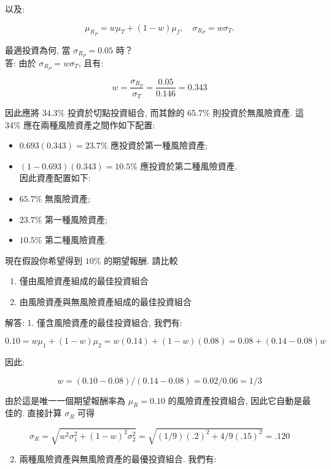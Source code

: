 \documentclass[letterpaper]{article}
\begin{document}
		以及: 
		
		$$
		\mu_{R_{P}}=w \mu_{T}+ (1-w) \mu_{f}, \quad \sigma_{R_{P}}=w \sigma_{T} .
		$$
		
		最適投資為何, 當 $\sigma_{R_{P}} = 0.05$ 時？\\
		答: 由於 $\sigma_{R_{P}} = w \sigma_{T}$, 且有: 
		
		
		$$
		w=\frac{\sigma_{R_{P}}}{\sigma_{T}}=\frac{0.05}{0.146}=0.343
		$$
		
		因此應將 34.3\% 投資於切點投資組合, 而其餘的 65.7\% 則投資於無風險資產. 這 34\% 應在兩種風險資產之間作如下配置: 
		
		
		\begin{itemize}
			\item $0.693 (0.343) =23.7\%$ 應投資於第一種風險資產; 
			\item $ (1-0.693) (0.343) =10.5\%$ 應投資於第二種風險資產. \\
			因此資產配置如下: 
			\item $65.7\%$ 無風險資產; 
			\item $23.7\%$ 第一種風險資產; 
			\item $10.5\%$ 第二種風險資產. 
		\end{itemize}
		
		
		現在假設你希望得到 $10\%$ 的期望報酬. 請比較
		
		\begin{enumerate}
			\item 僅由風險資產組成的最佳投資組合
			\item 由風險資產與無風險資產組成的最佳投資組合
		\end{enumerate}
		
		解答: 1. 僅含風險資產的最佳投資組合, 我們有: 
		
		
		$$
		0.10=w \mu_{1}+ (1-w) \mu_{2}=w (0.14) + (1-w) (0.08) =0.08+ (0.14-0.08) w
		$$
		
		因此: 
		
		$$
		w= (0.10-0.08) / (0.14-0.08) =0.02 / 0.06=1 / 3
		$$
		
		由於這是唯一一個期望報酬率為 $\mu_{R}=0.10$ 的風險資產投資組合, 因此它自動是最佳的. 直接計算 $\sigma_{R}$ 可得
		
		
		$$
		\sigma_{R}=\sqrt{w^{2} \sigma_{1}^{2}+ (1-w) ^{2} \sigma_{2}^{2}}=\sqrt{ (1 / 9) (.2) ^{2}+4 / 9 (.15) ^{2}}=.120
		$$
		
		\begin{enumerate}
			\setcounter{enumi}{1}
			\item 兩種風險資產與無風險資產的最優投資組合. 我們有: 
		\end{enumerate}
		
\end{document}
